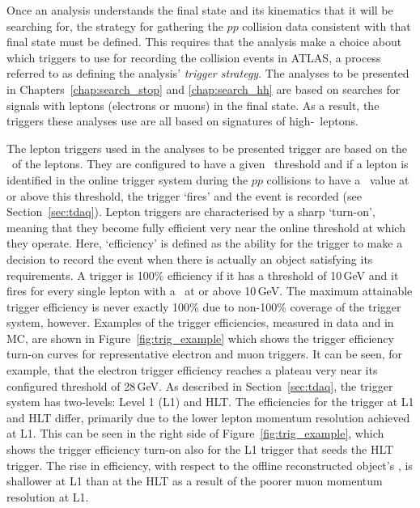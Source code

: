 Once an analysis understands the final state and its kinematics that it will be searching for,
the strategy for gathering the $pp$ collision data consistent with that final state must be defined.
This requires that the analysis make a choice about which triggers to use for recording
the collision events in ATLAS, a process referred to as defining the analysis' \textit{trigger strategy}.
The analyses to be presented in Chapters~\ref{chap:search_stop} and \ref{chap:search_hh} are based
on searches for signals with leptons (electrons or muons) in the final state.
As a result, the triggers these analyses use are all based on signatures of high-\pT~leptons.

The lepton triggers used in the analyses to be presented trigger are based on the \pT~of the leptons.
They are configured to have a given \pT~threshold and if a lepton is identified in the online trigger
system during the $pp$ collisions to have a \pT~value at or above this threshold, the trigger `fires' and the
event is recorded (see Section~\ref{sec:tdaq}).
Lepton triggers are characterised by a sharp `turn-on', meaning that they become fully efficient
very near the online threshold at which they operate. 
Here, `efficiency' is defined as the ability for the trigger to make a decision to record the event
when there is actually an object satisfying its requirements. A trigger is 100\% efficiency if it
has a threshold of 10\,GeV and it fires for every single lepton with a \pT~at or above 10\,GeV.
The maximum attainable trigger efficiency is never exactly 100\% due to non-100\% coverage of the
trigger system, however.
Examples of the trigger efficiencies, measured in data and in MC, are shown in Figure~\ref{fig:trig_example} which shows
the trigger efficiency turn-on curves for representative electron and muon triggers.
It can be seen, for example, that the electron trigger efficiency reaches a plateau very near
its configured threshold of 28\,GeV.
As described in Section~\ref{sec:tdaq}, the trigger system has two-levels: Level 1 (L1) and HLT.
The efficiencies for the trigger at L1 and HLT differ, primarily due to the lower lepton momentum resolution
achieved at L1.
This can be seen in the right side of Figure~\ref{fig:trig_example}, which shows the trigger
efficiency turn-on also for the L1 trigger that seeds the HLT trigger.
The rise in efficiency, with respect to the offline reconstructed object's \pT, is shallower
at L1 than at the HLT as a result of the poorer muon momentum resolution at L1.

